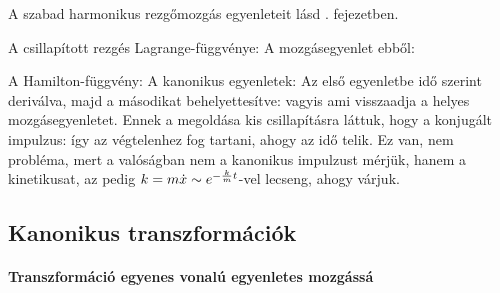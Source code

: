    A szabad harmonikus rezgőmozgás egyenleteit lásd . fejezetben. 
   
   A csillapított rezgés Lagrange-függvénye:
   A mozgásegyenlet ebből:
   
   A Hamilton-függvény:
   A kanonikus egyenletek:
   Az első egyenletbe idő szerint deriválva, majd a másodikat behelyettesítve:
   vagyis 
   ami visszaadja a helyes mozgásegyenletet. Ennek a megoldása kis csillapításra láttuk, hogy 
   a konjugált impulzus:
   így az végtelenhez fog tartani, ahogy az idő telik. Ez van, nem probléma, mert a valóságban nem a kanonikus impulzust mérjük, hanem a kinetikusat, az pedig $k=m\dot{x}\sim e^{-\frac{k}{m}t}$-vel lecseng, ahogy várjuk.
   
  \subsection{Kanonikus transzformációk}
   
   \paragraph{Transzformáció egyenes vonalú egyenletes mozgássá}
    
